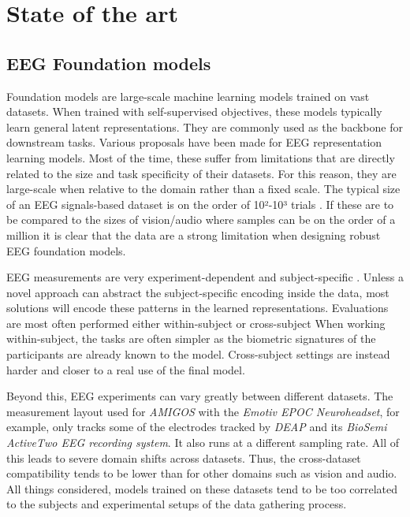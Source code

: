 


\chapter{State of the art}
\label{chap:sota}

\section{EEG Foundation models}
Foundation models are large-scale machine learning models trained on vast datasets.
When trained with self-supervised objectives, these models typically learn general latent representations.
They are commonly used as the backbone for downstream tasks.
Various proposals have been made for EEG representation learning models.
Most of the time, these suffer from limitations that are directly related to the size and task specificity of their datasets.
For this reason, they are large-scale when relative to the domain rather than a fixed scale.
The typical size of an EEG signals-based dataset is on the order of 10²-10³ trials \cite{8554112, Chen2023}.
If these are to be compared to the sizes of vision/audio where samples can be on the order of a million \cite{5206848, 7178964} it is clear
that the data are a strong limitation when designing robust EEG foundation models.

EEG measurements are very experiment-dependent and subject-specific \cite{10.3389/fncom.2019.00087}.
Unless a novel approach can abstract the subject-specific encoding inside the data, most solutions will encode these patterns in the learned representations.
Evaluations are most often performed either within-subject or cross-subject
When working within-subject, the tasks are often simpler as the biometric signatures of the participants are already known to the model.
Cross-subject settings are instead harder and closer to a real use of the final model.

Beyond this, EEG experiments can vary greatly between different datasets.
The measurement layout used for \textit{AMIGOS} \cite{8554112} with the \textit{Emotiv EPOC Neuroheadset}, for example, only tracks some
of the electrodes tracked by \textit{DEAP} \cite{5871728} and its \textit{BioSemi ActiveTwo EEG recording system}.
It also runs at a different sampling rate.
All of this leads to severe domain shifts across datasets.
Thus, the cross-dataset compatibility tends to be lower than for other domains such as vision and audio.
All things considered, models trained on these datasets tend to be too correlated to the subjects and experimental setups of the data gathering process.

